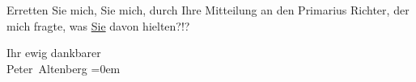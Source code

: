 \pstart
           Erretten Sie mich,  Sie mich, durch Ihre
               Mitteilung an den Primarius Richter, der mich
               fragte, was \uline{Sie} davon hielten?!?\pend
           
\pstart
           Ihr ewig dankbarer{\\[\baselineskip]}\spacefill\mbox{Peter Altenberg}\pend
           \leftskip=0em{}\endnumbering{}  \newcommand{\dateiname}{L02133}\newcommand{\titel}{Peter Altenberg an Arthur Schnitzler, [26. 4. 1913]}\newcommand{\editorInnen}{Martin Anton Müller und Gerd-Hermann Susen}
